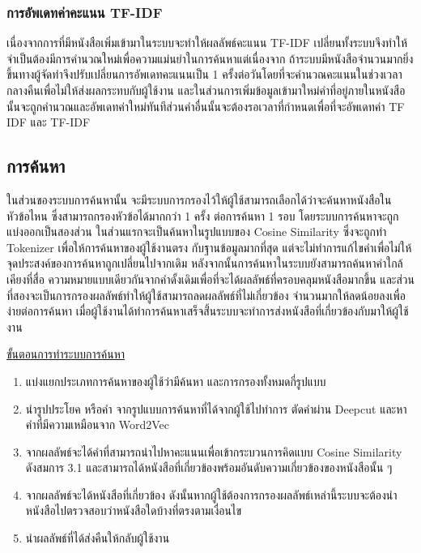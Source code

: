 \subsubsection{การอัพเดทค่าคะแนน TF-IDF}

เนื่องจากการที่มีหนังสือเพิ่มเข้ามาในระบบจะทำให้ผลลัพธ์คะแนน TF-IDF เปลี่ยนทั้งระบบจึงทำให้จำเป็นต้องมีการคำนวณใหม่เพื่อความแม่นยำในการค้นหาแต่เนื่องจาก
ถ้าระบบมีหนังสือจำนวนมากยิ่งขึ้นทางผู้จัดทำจึงปรับเปลี่ยนการอัพเดทคะแนนเป็น 1 ครั้งต่อวันโดยที่จะคำนวณคะแนนในช่วงเวลากลางคืนเพื่อไม่ให้ส่งผลกระทบกับผู้ใช้งาน 
และในส่วนการเพิ่มข้อมูลเข้ามาใหม่คำที่อยู่ภายในหนังสือนั้นจะถูกคำนวณและอัพเดทค่าใหม่ทันทีส่วนคำอื่นนั้นจะต้องรอเวลาที่กำหนดเพื่อที่จะอัพเดทค่า TF IDF และ TF-IDF 

\subsection{การค้นหา}

ในส่วนของระบบการค้นหานั้น จะมีระบบการกรองไว้ให้ผู้ใช้สามารถเลือกได้ว่าจะค้นหาหนังสือในหัวข้อไหน ซึ่งสามารถกรองหัวข้อได้มากกว่า 1 ครั้ง ต่อการค้นหา 1 รอบ 
โดยระบบการค้นหาจะถูกแบ่งออกเป็นสองส่วน ในส่วนแรกจะเป็นค้นหาในรูปแบบของ Cosine Similarity ซึ่งจะถูกทำ  Tokenizer เพื่อให้การค้นหาของผู้ใช้งานตรง
กับฐานข้อมูลมากที่สุด แต่จะไม่ทำการแก้ไขคำเพื่อไม่ให้จุดประสงค์ของการค้นหาถูกเปลี่ยนไปจากเดิม หลังจากนั้นการค้นหาในระบบยังสามารถค้นหาคำใกล้เคียงที่สื่อ
ความหมายแบบเดียวกันจากคำดั้งเดิมเพื่อที่จะได้ผลลัพธ์ที่ครอบคลุมหนังสือมากขึ้น และส่วนที่สองจะเป็นการกรองผลลัพธ์ทำให้ผู้ใช้สามารถลดผลลัพธ์ที่ไม่เกี่ยวข้อง
จำนวนมากให้ลดน้อยลงเพื่อง่ายต่อการค้นหา เมื่อผู้ใช้งานได้ทำการค้นหาเสร็จสิ้่นระบบจะทำการส่งหนังสือที่เกี่ยวข้องกับมาให้ผู้ใช้งาน

\underline{ขั้นตอนการทำระบบการค้นหา}

\begin{enumerate}
    \item แบ่งแยกประเภทการค้นหาของผู้ใช้ว่ามีค้นหา และการกรองทั้งหมดกี่รูปแบบ
    \item นำรูปประโยค หรือคำ จากรูปแบบการค้นหาที่ได้จากผู้ใช้ไปทำการ ตัดคำผ่าน Deepcut และหาคำที่มีความเหมือนจาก Word2Vec
    \item จากผลลัพธ์จะได้คำที่สามารถนำไปหาคะแนนเพื่อเข้ากระบวนการคิดแบบ Cosine Similarity ดังสมการ 3.1 และสามารถได้หนังสือที่เกี่ยวข้องพร้อมอันดับความเกี่ยวข้องของหนังสือนั้น ๆ
    \item จากผลลัพธ์จะได้หนังสือที่เกี่ยวข้อง ดังนั้นหากผู้ใช้ต้องการกรองผลลัพธ์เหล่านี้ระบบจะต้องนำหนังสือไปตรวจสอบว่าหนังสือใดบ้างที่ตรงตามเงื่อนไข
    \item นำผลลัพธ์ที่ได้ส่งคืนให้กลับผู้ใช้งาน
\end{enumerate}


